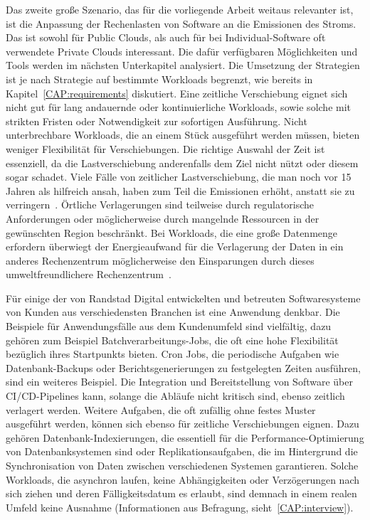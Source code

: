 Das zweite große Szenario, das für die vorliegende Arbeit weitaus relevanter ist, ist die Anpassung der Rechenlasten von Software an die Emissionen des Stroms.
Das ist sowohl für Public Clouds, als auch für bei Individual-Software oft verwendete Private Clouds interessant.
Die dafür verfügbaren Möglichkeiten und Tools werden im nächsten Unterkapitel analysiert.
Die Umsetzung der Strategien ist je nach Strategie auf bestimmte Workloads begrenzt, wie bereits in Kapitel~\ref{CAP:requirements} diskutiert.
Eine zeitliche Verschiebung eignet sich nicht gut für lang andauernde oder kontinuierliche Workloads, sowie solche mit strikten Fristen oder Notwendigkeit zur sofortigen Ausführung.
Nicht unterbrechbare Workloads, die an einem Stück ausgeführt werden müssen, bieten weniger Flexibilität für Verschiebungen.
Die richtige Auswahl der Zeit ist essenziell, da die Lastverschiebung anderenfalls dem Ziel nicht nützt oder diesem sogar schadet.
Viele Fälle von zeitlicher Lastverschiebung, die man noch vor 15 Jahren als hilfreich ansah, haben zum Teil die Emissionen erhöht, anstatt sie zu verringern~\cite{WattTime.12.3.2024}.
Örtliche Verlagerungen sind teilweise durch regulatorische Anforderungen oder möglicherweise durch mangelnde Ressourcen in der gewünschten Region beschränkt.
Bei Workloads, die eine große Datenmenge erfordern überwiegt der Energieaufwand für die Verlagerung der Daten in ein anderes Rechenzentrum möglicherweise den Einsparungen durch dieses umweltfreundlichere Rechenzentrum~\cite{Norlander.2023}.

Für einige der von Randstad Digital entwickelten und betreuten Softwaresysteme von Kunden aus verschiedensten Branchen ist eine Anwendung denkbar.
Die Beispiele für Anwendungsfälle aus dem Kundenumfeld sind vielfältig, dazu gehören zum Beispiel Batchverarbeitungs-Jobs, die oft eine hohe Flexibilität bezüglich ihres Startpunkts bieten.
Cron Jobs, die periodische Aufgaben wie Datenbank-Backups oder Berichtsgenerierungen zu festgelegten Zeiten ausführen, sind ein weiteres Beispiel.
Die Integration und Bereitstellung von Software über CI/CD-Pipelines kann, solange die Abläufe nicht kritisch sind, ebenso zeitlich verlagert werden.
Weitere Aufgaben, die oft zufällig ohne festes Muster ausgeführt werden, können sich ebenso für zeitliche Verschiebungen eignen.
Dazu gehören Datenbank-Indexierungen, die essentiell für die Performance-Optimierung von Datenbanksystemen sind oder Replikationsaufgaben, die im Hintergrund die Synchronisation von Daten zwischen verschiedenen Systemen garantieren.
Solche Workloads, die asynchron laufen, keine Abhängigkeiten oder Verzögerungen nach sich ziehen und deren Fälligkeitsdatum es erlaubt, sind demnach in einem realen Umfeld keine Ausnahme (Informationen aus Befragung, sieht~\ref{CAP:interview}).

